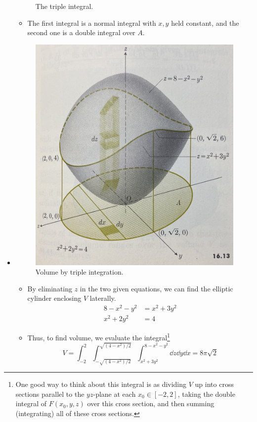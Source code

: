 \documentclass[../main.tex]{subfiles}
\begin{document}
\begin{itemize}
\begin{figure}[h!]
        \caption{The triple integral.}
        \label{fig:tripleIntegral}
    \end{figure}
    \begin{itemize}
        \item The first integral is a normal integral with $x,y$ held constant, and the second one is a double integral over $A$.
    \end{itemize}
    \item {}
    \begin{figure}[H]
        \centering
        \includegraphics[width=0.4\linewidth]{ExtFiles/volume3Integral.jpg}
        \caption{Volume by triple integration.}
        \label{fig:volume3Integral}
    \end{figure}
    \begin{itemize}
        \item By eliminating $z$ in the two given equations, we can find the elliptic cylinder enclosing $V$ laterally.
        \begin{align*}
            8-x^2-y^2 &= x^2+3y^2\\
            x^2+2y^2 &= 4
        \end{align*}
        \item Thus, to find volume, we evaluate the integral\footnote{One good way to think about this integral is as dividing $V$ up into cross sections parallel to the $yz$-plane at each $x_0\in[-2,2]$, taking the double integral of $F(x_0,y,z)$ over this cross section, and then summing (integrating) all of these cross sections.}
        \begin{equation*}
            V = \int_{-2}^2\int_{-\sqrt{(4-x^2)/2}}^{\sqrt{(4-x^2)/2}}\int_{x^2+3y^2}^{8-x^2-y^2}\dd{z}\dd{y}\dd{x} = 8\pi\sqrt{2}
        \end{equation*}
    \end{itemize}
\end{itemize}
\end{document}
